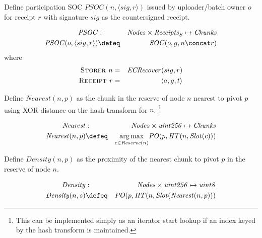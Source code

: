 
\begin{definition}
\label{def:psoc}
Define participation SOC $\mathit{PSOC}(n, \langle sig, r\rangle)$ issued by uploader/batch owner $o$
for receipt $r$ with signature $sig$ as the countersigned receipt.

\begin{eqnarray}
\mathit{PSOC} &:& \mathit{Nodes}\times\mathit{Receipts}_S\mapsto  \mathit{Chunks}\\
\mathit{PSOC}(o, \langle sig, r\rangle)&\defeq&\mathit{SOC}(o,g,n\concat r)
\end{eqnarray}
where
\begin{eqnarray}
\textsc{Storer } n&=&\mathit{ECRecover}(sig,r)\\
\textsc{Receipt } r&=& \langle a,g,t\rangle 
\end{eqnarray}

\end{definition}


\begin{definition}
\label{def:nearest}
Define  $\mathit{Nearest}(n,p)$ as the chunk in the reserve of node $n$ nearest to pivot $p$ using XOR distance on the hash transform for $n$.%
%
\footnote{This can be implemented simply as an iterator start lookup if an index keyed by the hash transform is maintained.}

\begin{eqnarray}
\mathit{Nearest}&: &\mathit{Nodes}\times \mathit{uint256} \mapsto \mathit{Chunks}
\\
\mathit{Nearest}(n,p)&\defeq &\underset{c\in \mathit{Reserve}(n)}{\operatorname{arg\,max}}\mathit{PO}(p,\mathit{HT}(n,\mathit{Slot}(c)))
\end{eqnarray}
\end{definition}

\begin{definition}[Density]
\label{def:density}
Define  $\mathit{Density}(n,p)$ as the proximity of the nearest chunk to pivot $p$ in the reserve of node $n$.

\begin{eqnarray}
\mathit{Density}&:& \mathit{Nodes}\times \mathit{uint256} \mapsto \mathit{uint8}
\\
\mathit{Density}(n,s)&\defeq& \mathit{PO}(p, \mathit{HT}(n,\mathit{Slot}(\mathit{Nearest}(n,p)))
\end{eqnarray}


\end{definition}


